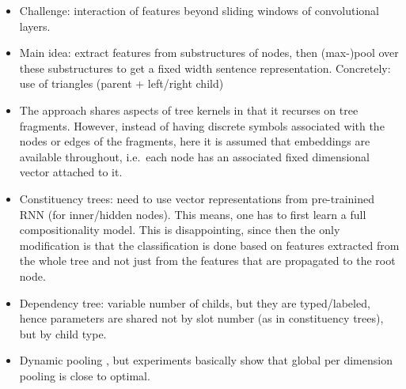 \documentclass{article}
\begin{document}
\begin{itemize}
\item Challenge: interaction of features beyond sliding windows of convolutional layers. 
\item Main idea: extract features from substructures of nodes, then (max-)pool over these substructures to get a fixed width sentence representation. Concretely: use of triangles (parent + left/right child)
\item The approach shares aspects of tree kernels in that it recurses on tree fragments. However, instead of having discrete symbols associated with the nodes or edges of the fragments, here it is assumed that embeddings are available throughout, i.e.~each node has an associated fixed dimensional vector attached to it. 
\item Constituency trees: need to use vector representations from pre-trainined RNN (for inner/hidden nodes). This means, one has to first learn a full compositionality model. This is disappointing, since then the only modification is that the classification is done based on features extracted from the whole tree and not just from the features that are propagated to the root node. 
\item Dependency tree: variable number of childs, but they are typed/labeled, hence parameters are shared not by slot number (as in constituency trees), but by child type. 
\item Dynamic pooling \cite{socher2011dynamic}, but experiments basically show that global per dimension pooling is close to optimal. 
\end{itemize}



\end{document}
